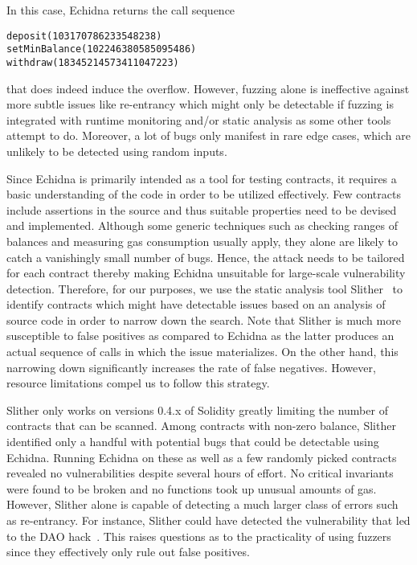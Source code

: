 In this case, Echidna returns the call sequence 
\begin{lstlisting}[basicstyle=\small]
deposit(103170786233548238)
setMinBalance(102246380585095486)
withdraw(18345214573411047223)
\end{lstlisting}
that does indeed induce the overflow. However, fuzzing alone is ineffective against more subtle issues like re-entrancy which might only be detectable if fuzzing is integrated with runtime monitoring and/or static analysis as some other tools attempt to do. Moreover, a lot of bugs only manifest in rare edge cases, which are unlikely to be detected using random inputs.

Since Echidna is primarily intended as a tool for testing contracts, it requires a basic understanding of the code in order to be utilized effectively. Few contracts include assertions in the source and thus suitable properties need to be devised and implemented. Although some generic techniques such as checking ranges of balances and measuring gas consumption usually apply, they alone are likely to catch a vanishingly small number of bugs. Hence, the attack needs to be tailored for each contract thereby making Echidna unsuitable for large-scale vulnerability detection. Therefore, for our purposes, we use the static analysis tool Slither~\cite{slither} to identify contracts which might have detectable issues based on an analysis of source code in order to narrow down the search. Note that Slither is much more susceptible to false positives as compared to Echidna as the latter produces an actual sequence of calls in which the issue materializes. On the other hand, this narrowing down significantly increases the rate of false negatives. However, resource limitations compel us to follow this strategy.

Slither only works on versions 0.4.x of Solidity greatly limiting the number of contracts that can be scanned. Among contracts with non-zero balance, Slither identified only a handful with potential bugs that could be detectable using Echidna. Running Echidna on these as well as a few randomly picked contracts revealed no vulnerabilities despite several hours of effort. No critical invariants were found to be broken and no functions took up unusual amounts of gas. However, Slither alone is capable of detecting a much larger class of errors such as re-entrancy. For instance, Slither could have detected the vulnerability that led to the DAO hack~\cite{slither}. This raises questions as to the practicality of using fuzzers since they effectively only rule out false positives.